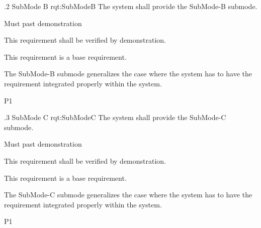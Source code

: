 \ONERQMTV
{\RqtNumberBase.2}
{SubMode B}
{rqt:SubModeB}
{The system shall provide the SubMode-B submode.}
{
	\item [Phase 1] Must past demonstration
}
{This requirement shall be verified by demonstration.}
{
	\item [N/A] This requirement is a base requirement.
}
{
	\item The SubMode-B submode generalizes the case where the system has to have the requirement integrated properly within the system.
}
{P1}


\ONERQMTV
{\RqtNumberBase.3}
{SubMode C}
{rqt:SubModeC}
{The system shall provide the SubMode-C submode.}
{
	\item [Phase 1] Must past demonstration
}
{This requirement shall be verified by demonstration.}
{
	\item [N/A] This requirement is a base requirement.
}
{
	\item The SubMode-C submode generalizes the case where the system has to have the requirement integrated properly within the system.
}
{P1}

